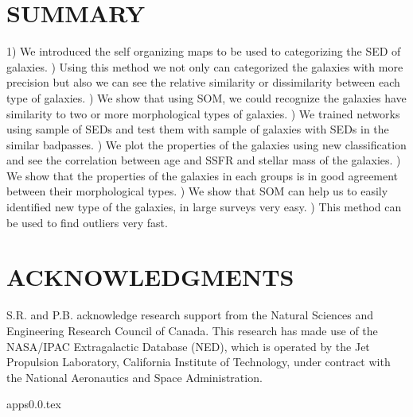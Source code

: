 \documentclass[useAMS,usenatbib]{mn2e}
\begin{document}
\section{SUMMARY}
\label{sec: summary}
1) We introduced the self organizing maps to be used to categorizing the SED of galaxies.
) Using this method we not only can categorized the galaxies with more precision but also we can see the relative similarity or dissimilarity between each type of galaxies.  
) We show that using SOM, we could recognize the galaxies have similarity to two or more morphological types of galaxies.
) We trained networks using sample of SEDs and test them with sample of galaxies with SEDs in the similar badpasses.
) We plot the properties of the galaxies using new classification and see the correlation between age and SSFR and stellar mass of the galaxies.
) We show that the properties of the galaxies in each groups is in good agreement between their morphological types.
) We show that SOM can help us to easily identified new type of the galaxies, in large surveys very easy. 
) This method can be used to find outliers very fast.
\newline


\section*{ACKNOWLEDGMENTS}
S.R. and P.B. acknowledge research support from the Natural Sciences and Engineering Research Council of Canada. This research has made use of the NASA/IPAC Extragalactic Database (NED), which is operated by the Jet Propulsion Laboratory, California Institute of Technology, under contract with the National Aeronautics and Space Administration.



{apps0.0.tex}
\end{document}
